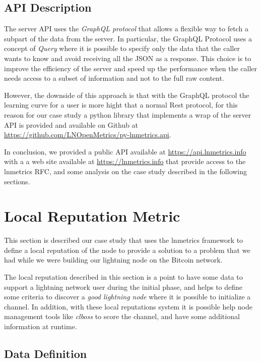 \subsection{API Description}

The server API uses the \emph{GraphQL protocol} that allows a flexible way to fetch
a subpart of the data from the server. In particular, the GraphQL Protocol uses
a concept of \emph{Query} where it is possible to specify only the data that the 
caller wants to know and avoid receiving all the JSON as a response. This choice is to
improve the efficiency of the server and speed up the performance when the caller needs 
access to a subset of information and not to the full raw content. 

However, the downside of this approach is that with the GraphQL protocol the learning 
curve for a user is more hight that a normal Rest protocol, for this reason for our
case study a python library that implements a wrap of the server API is provided 
and available on Github at \url{https://github.com/LNOpenMetrics/py-lnmetrics.api}. 

In conclusion, we provided a public API available at \url{https://api.lnmetrics.info} with a 
a web site available at \url{https://lnmetrics.info} that provide access to the 
lnmetrics RFC, and some analysis on the case study described in the 
following sections.

\section{Local Reputation Metric}
\label{sec:demo}

This section is described our case study that uses the lnmetrics framework to 
define a local reputation of the node to provide a solution to a problem 
that we had while we were building our lightning node on the Bitcoin network.

The local reputation described in this section is a point to have some data 
to support a lightning network user during the initial phase, and 
helps to define some criteria to discover a \emph{good lightning node} 
where it is possible to initialize a channel. In addition, with these local reputations 
system it is possible help node management tools like \emph{clboss}\cite{clboss}
to score the channel, and have some additional information at runtime.

\subsection{Data Definition}
\label{sec:data_definition_datadef}

